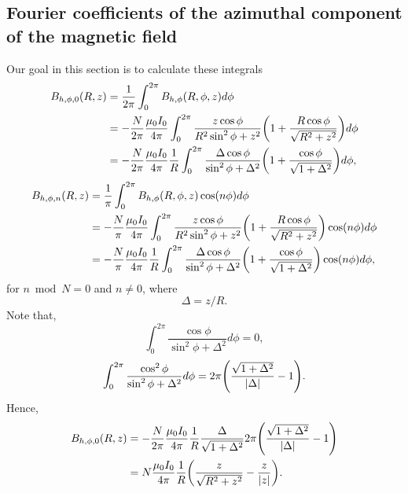 \documentclass{article}
\begin{document}

\subsection{Fourier coefficients of the azimuthal component of the magnetic field}

Our goal in this section is to calculate these integrals
\[\begin{aligned}
B_{h, \phi, 0}(R, z)&=\frac{1}{2\pi}\int_{0}^{2\pi}B_{h, \phi}(R, \phi, z)d\phi \\
&= -\frac{N}{2\pi}\frac{\mu_0 I_0}{4 \pi}\int_0^{2\pi} \frac{z\cos\phi}{R^2\sin^2\phi+z^2}\qty(1+\frac{R\cos\phi}{\sqrt{R^2+z^2}})d\phi \\
&= -\frac{N}{2\pi}\frac{\mu_0 I_0}{4 \pi}\frac{1}{R}\int_0^{2\pi} \frac{\Delta\cos\phi}{\sin^2\phi+\Delta^2}\qty(1+\frac{\cos\phi}{\sqrt{1+\Delta^2}})d\phi,
\end{aligned}\]
\[\begin{aligned}
B_{h, \phi, n}(R, z)&=\frac{1}{\pi}\int_{0}^{2\pi}B_{h, \phi}(R, \phi, z)\cos(n\phi)d\phi \\
&= -\frac{N}{\pi}\frac{\mu_0 I_0}{4 \pi}\int_0^{2\pi} \frac{z\cos\phi}{R^2\sin^2\phi+z^2}\qty(1+\frac{R\cos\phi}{\sqrt{R^2+z^2}})\cos(n\phi)d\phi \\
&= -\frac{N}{\pi}\frac{\mu_0 I_0}{4 \pi}\frac{1}{R}\int_0^{2\pi} \frac{\Delta\cos\phi}{\sin^2\phi+\Delta^2}\qty(1+\frac{\cos\phi}{\sqrt{1+\Delta^2}})\cos(n\phi)d\phi,
\end{aligned}\]
for $n \bmod N = 0$ and $n\ne0$,
where
\[\Delta = z/R.\]
Note that,
\[\int_0^{2\pi} \frac{\cos\phi}{\sin^2\phi+\Delta^2}d\phi = 0,\]
\[\int_0^{2\pi} \frac{\cos^2\phi}{\sin^2\phi+\Delta^2}d\phi = 2\pi\qty(\frac{\sqrt{1+\Delta^2}}{|\Delta|}-1).\]
Hence,
\[\begin{aligned}
    B_{h, \phi, 0}(R, z)&=-\frac{N}{2\pi}\frac{\mu_0 I_0}{4 \pi}\frac{1}{R} \frac{\Delta}{\sqrt{1+\Delta^2}} 2\pi\qty(\frac{\sqrt{1+\Delta^2}}{|\Delta|}-1) \\
    &= N\frac{\mu_0 I_0}{4 \pi}\frac{1}{R}\qty(\frac{z}{\sqrt{R^2+z^2}}-\frac{z}{|z|}).
\end{aligned}
\]
\end{document}
